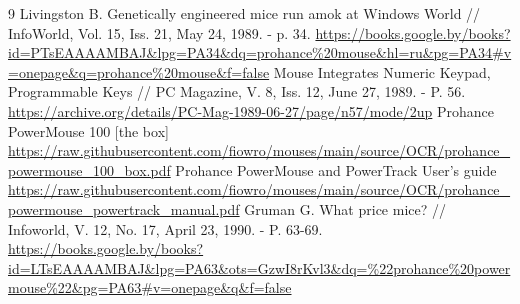 \documentclass[11pt, a4paper]{article}
\begin{document}
\begin{thebibliography}{9}
 Livingston B. Genetically engineered mice run amok at Windows World // InfoWorld, Vol. 15, Iss. 21, May 24, 1989. - p. 34. \url{https://books.google.by/books?id=PTsEAAAAMBAJ&lpg=PA34&dq=prohance%20mouse&hl=ru&pg=PA34#v=onepage&q=prohance%20mouse&f=false}
 Mouse Integrates Numeric Keypad, Programmable Keys // PC Magazine, V. 8, Iss. 12, June 27, 1989. - P. 56. \url{https://archive.org/details/PC-Mag-1989-06-27/page/n57/mode/2up}
 Prohance PowerMouse 100 [the box] \url{https://raw.githubusercontent.com/fiowro/mouses/main/source/OCR/prohance_powermouse_100_box.pdf}
 Prohance PowerMouse and PowerTrack User's guide \url{https://raw.githubusercontent.com/fiowro/mouses/main/source/OCR/prohance_powermouse_powertrack_manual.pdf}
 Gruman G. What price mice? // Infoworld, V. 12, No. 17, April 23, 1990. - P. 63-69. \url{https://books.google.by/books?id=LTsEAAAAMBAJ&lpg=PA63&ots=GzwI8rKvl3&dq=%22prohance%20powermouse%22&pg=PA63#v=onepage&q&f=false}
\end{thebibliography}
\end{document}
